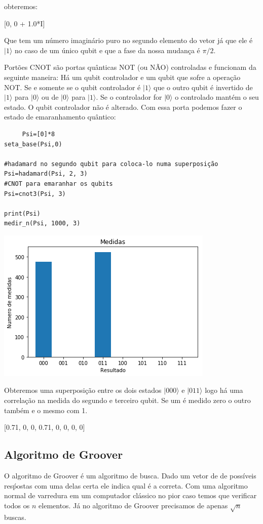 \documentclass[12pt,a4paper]{article}
\begin{document}
obteremos:

[0, 0 + 1.0*I]

Que tem um número imaginário puro no segundo elemento do vetor já que ele é $|1\rangle$ no caso de um único qubit e que a fase da nossa mudança é $\pi/2$.


 Portões CNOT são portas quânticas NOT (ou NÃO) controladas e funcionam da seguinte maneira: Há um qubit controlador e um qubit que sofre a operação NOT. Se e somente se o qubit controlador é $|1\rangle$ que o outro qubit é invertido de $|1\rangle$ para $|0\rangle$ ou de $|0\rangle$ para $|1\rangle$. Se o controlador for $|0\rangle$ o controlado mantém o seu estado. O qubit controlador não é alterado. Com essa porta podemos fazer o estado de emaranhamento quântico:
 
 \begin{verbatim}
     Psi=[0]*8
seta_base(Psi,0)

#hadamard no segundo qubit para coloca-lo numa superposição
Psi=hadamard(Psi, 2, 3)  
#CNOT para emaranhar os qubits
Psi=cnot3(Psi, 3)

print(Psi)
medir_n(Psi, 1000, 3)
 \end{verbatim}

\includegraphics[]{relatorio-superposicao.png}


Obteremos uma superposição entre os dois estados $|000\rangle$ e $|011\rangle$ logo há uma correlação na medida do segundo e terceiro qubit. Se um é medido zero o outro também e o mesmo com 1.

[0.71, 0, 0, 0.71, 0, 0, 0, 0]
\subsection{Algoritmo de Groover}
O algoritmo de Groover é um algoritmo de busca. Dado um vetor de de possíveis resṕostas com uma delas certa ele indica qual é a correta. Com uma algoritmo normal de varredura em um computador clássico no pior caso temos que verificar todos os $n$ elementos. Já no algoritmo de Groover precisamos de apenas $\sqrt{n}$ buscas.
\end{document}
